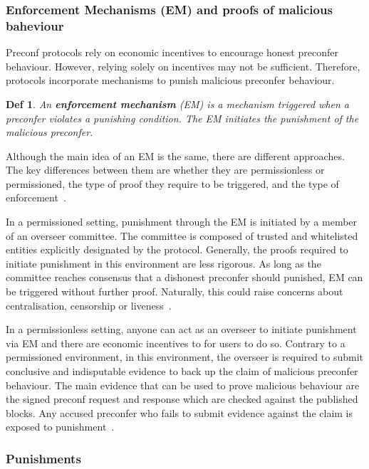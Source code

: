 \documentclass[a4paper]{article}
\theoremstyle{boldstyle}
\newtheorem*{definitionx}{Def}
\newenvironment{definition}
  {\begin{defopenboxq}\begin{definitionx}}
  {\end{definitionx}\end{defopenboxq}}
\begin{document}
\subsubsection{Enforcement Mechanisms (EM) and proofs of malicious baheviour} 
    Preconf protocols rely on economic incentives to encourage honest preconfer behaviour. However, relying solely on incentives may not be sufficient. Therefore, protocols incorporate mechanisms to punish malicious preconfer behaviour.

    \begin{definition}
        An \textbf{enforcement mechanism} (EM) is a mechanism 
        triggered when a preconfer violates a punishing condition. The EM initiates the punishment of the malicious preconfer.
    \end{definition}

    Although the main idea of an EM is the same, there are different approaches. The key differences between them are whether they are permissionless or permissioned, the type of proof they require to be triggered, and the type of enforcement~\cite{W:PreconfirmationFairExchange}.

    In a permissioned setting, punishment through the EM is initiated by a member of an overseer committee. The committee is composed of trusted and whitelisted entities explicitly designated by the protocol. Generally, the proofs required to initiate punishment in this environment are less rigorous.  As long as the committee reaches consensus that a dishonest preconfer should punished, EM can be triggered without further proof. Naturally, this could raise concerns about centralisation, censorship or liveness~\cite{W:PreconfirmationFairExchange}.

    In a permissionless setting, anyone can act as an overseer to initiate punishment via EM and there are economic incentives to for users to do so. Contrary to a permissioned environment, in this environment, the overseer is required to submit conclusive and indisputable evidence to back up the claim of malicious preconfer behaviour. The main evidence that can be used to prove malicious behaviour are the signed preconf request and response which are checked against the published blocks. Any accused preconfer who fails to submit evidence against the claim is exposed to punishment~\cite{W:GitHub-UniversalRegistryContract,W:GitHub-ExampleSlasherImplementations,W:PreconfirmationFairExchange}.

    \subsubsection{Punishments}
    
\end{document}
